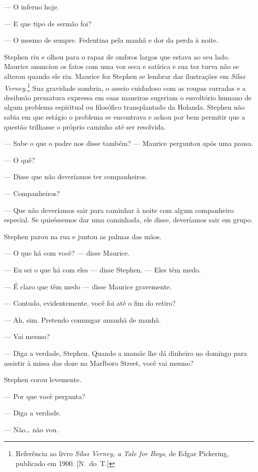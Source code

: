--- O inferno hoje.

--- E que tipo de sermão foi?

--- O mesmo de sempre.  Fedentina pela manhã e dor da perda à
noite.

Stephen riu e olhou para o rapaz de ombros largos que estava ao seu
lado.  Maurice anunciou os fatos com uma voz seca e satírica e sua tez
turva não se alterou quando ele riu.  Maurice fez Stephen se lembrar
das ilustrações em \textit{Silas Verney.}\footnote[\setcounter{symbol}{2}]{ Referência ao livro
\textit{Silas Verney, a Tale for Boys}, de Edgar Pickering, publicado
em 1900. [N.~do~T.]} Sua gravidade sombria, o asseio cuidadoso
com as roupas surradas e a desilusão prematura expressa em suas
maneiras sugeriam o envoltório humano de algum problema espiritual ou
filosófico transplantado da Holanda.  Stephen não sabia em que estágio
o problema se encontrava e achou por bem permitir que a questão
trilhasse o próprio caminho até ser resolvida.

--- Sabe o que o padre nos disse também? --- Maurice perguntou após
uma pausa.

--- O quê?

--- Disse que não deveríamos ter companheiros.

--- Companheiros?

--- \label{que"-nao} Que não deveríamos sair para caminhar à noite com algum
companheiro especial.  Se quiséssemos dar uma caminhada, ele disse,
deveríamos sair em grupo.

Stephen parou na rua e juntou as palmas das mãos.

--- O que há com você? --- disse Maurice.

--- Eu sei o que há com eles --- disse Stephen.  --- Eles têm medo.

--- É claro que têm medo --- disse Maurice gravemente.

--- Contudo, evidentemente, você foi até o fim do retiro?

--- Ah, sim.  Pretendo comungar amanhã de manhã.

--- Vai mesmo?

--- Diga a verdade, Stephen.  Quando a mamãe lhe dá dinheiro no
domingo para assistir à missa das doze na Marlboro Street, você vai
mesmo?

Stephen corou levemente.

--- Por que você pergunta?

--- Diga a verdade.

--- Não\ldots{} não vou.

